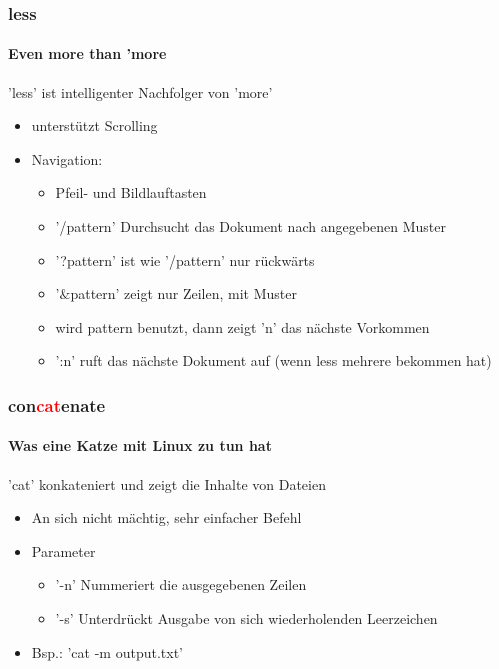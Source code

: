 \documentclass[12pt,utf8, handout]{beamer}
\begin{document}
\begin{frame}
\frametitle{less}
\framesubtitle{Even more than 'more}
'less' ist intelligenter Nachfolger von 'more'
\begin{itemize}
	\item unterstützt Scrolling
	\item Navigation:
	\begin{itemize}[<+->]
		\item Pfeil- und Bildlauftasten
		\item '/pattern' Durchsucht das Dokument nach angegebenen Muster
		\item '?pattern' ist wie '/pattern' nur rückwärts
		\item '$\&$pattern' zeigt nur Zeilen, mit Muster
		\item wird pattern benutzt, dann zeigt 'n' das nächste Vorkommen
		\item ':n' ruft das nächste Dokument auf (wenn less mehrere bekommen hat)
	\end{itemize}
\end{itemize}
\end{frame}

\begin{frame}
\frametitle{con\textcolor{red}{cat}enate}
\framesubtitle{Was eine Katze mit Linux zu tun hat}
'cat' konkateniert und zeigt die Inhalte von Dateien
\begin{itemize}[<+->]
	\item An sich nicht mächtig, sehr einfacher Befehl
	\item Parameter
	\begin{itemize}
		\item '-n' Nummeriert die ausgegebenen Zeilen 
		\item '-s' Unterdrückt Ausgabe von sich wiederholenden Leerzeichen
	\end{itemize}
	\item Bsp.: 'cat -m output.txt'
\end{itemize}
\end{frame}
\end{document}
